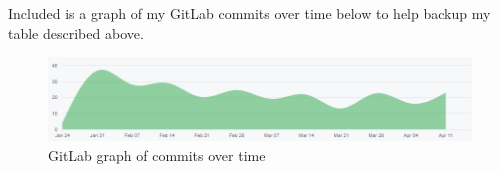 Included is a graph of my GitLab commits over time below to help backup my table described above. 

\begin{figure}[H]
	\centering
	\includegraphics[width=1\linewidth]{Figures/gitlab-commit-graph.png}
	\caption{GitLab graph of commits over time}
	\label{fig:gitlab-graph}
\end{figure}